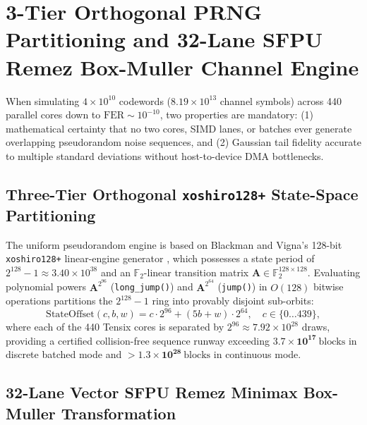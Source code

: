 \documentclass[10pt]{article}
\begin{document}
\section{3-Tier Orthogonal PRNG Partitioning and 32-Lane SFPU Remez Box-Muller Channel Engine}
\label{sec:prng_channel}

When simulating $4 \times 10^{10}$ codewords ($8.19 \times 10^{13}$ channel symbols) across 440 parallel cores down to $\mathrm{FER} \sim 10^{-10}$, two properties are mandatory: (1) mathematical certainty that no two cores, SIMD lanes, or batches ever generate overlapping pseudorandom noise sequences, and (2) Gaussian tail fidelity accurate to multiple standard deviations without host-to-device DMA bottlenecks.

\subsection{Three-Tier Orthogonal \texttt{xoshiro128+} State-Space Partitioning}

The uniform pseudorandom engine is based on Blackman and Vigna's 128-bit \texttt{xoshiro128+} linear-engine generator \cite{blackman_vigna_xoshiro}, which possesses a state period of $2^{128} - 1 \approx 3.40 \times 10^{38}$ and an $\mathbb{F}_2$-linear transition matrix $\mathbf{A} \in \mathbb{F}_2^{128 \times 128}$. Evaluating polynomial powers $\mathbf{A}^{2^{96}}$ (\texttt{long\_jump()}) and $\mathbf{A}^{2^{64}}$ (\texttt{jump()}) in $O(128)$ bitwise operations partitions the $2^{128}-1$ ring into provably disjoint sub-orbits:
\begin{equation}
\mathrm{StateOffset}(c, b, w) = c \cdot 2^{96} + (5b + w) \cdot 2^{64}, \quad c \in \{0 \dots 439\},
\end{equation}
where each of the 440 Tensix cores is separated by $2^{96} \approx 7.92 \times 10^{28}$ draws, providing a certified collision-free sequence runway exceeding $\mathbf{3.7 \times 10^{17}\ \mathrm{blocks}}$ in discrete batched mode and $\mathbf{>1.3 \times 10^{28}\ \mathrm{blocks}}$ in continuous mode.

\subsection{32-Lane Vector SFPU Remez Minimax Box-Muller Transformation}
\end{document}
